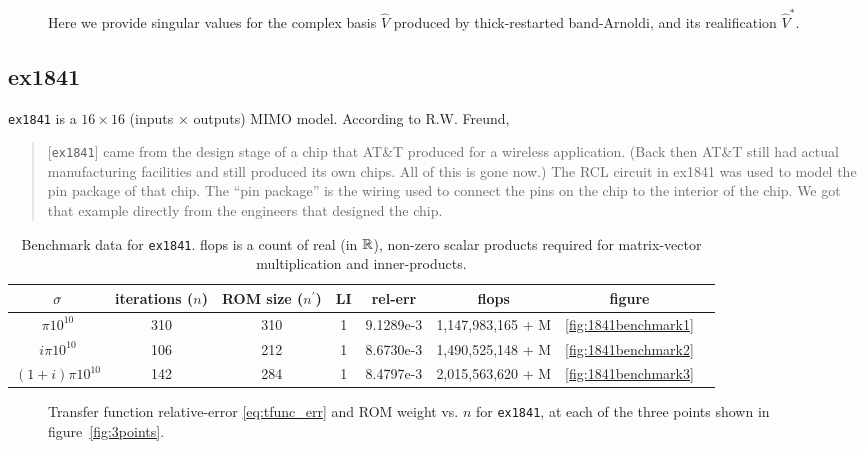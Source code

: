 \begin{figure}
\caption{\label{fig:308test1_svd} Here we provide singular values for the complex basis $\widehat{V}$ produced by thick-restarted band-Arnoldi, and its realification $\widehat{V}^*$.} 
\end{figure}


\clearpage
\subsection{ex1841}
\texttt{ex1841} is a $16\times 16$ (inputs $\times$ outputs) MIMO model.   According to R.W. Freund,
\begin{quote}
[\texttt{ex1841}] came from the design stage of a chip that AT\&T
produced for a wireless application.  (Back then AT\&T still had
actual manufacturing facilities and still produced its own chips.
All of this is gone now.)  The RCL circuit in ex1841 was used to
model the pin package of that chip.  The ``pin package'' is the
wiring used to connect the pins on the chip to the interior of the
chip.  We got that example directly from the engineers that designed
the chip. 
\end{quote}


\begin{table}
\centering
\begin{tabular}{|c|c|c|c|c|c|c|c|}
\hline
$\sigma$ & iterations ($n$) & ROM size ($n^\prime$) & LI &rel-err  & flops & figure  \\
\hline
$\pi 10^{10}$  & 310 &310 & 1 & 9.1289e-3 &   1,147,983,165 + M& \ref{fig:1841benchmark1}  \\
$i \pi  10^{10}$ &  106 & 212& 1 & 8.6730e-3 &  1,490,525,148 + M  &\ref{fig:1841benchmark2} \\
$(1+i)\pi 10^{10}$ & 142 & 284& 1&  8.4797e-3 &  2,015,563,620 + M&\ref{fig:1841benchmark3} \\
\hline
\end{tabular}
\caption{\label{tab:1841tab1}Benchmark data for \texttt{ex1841}.  flops is a count of real (in $\mathbb{R}$), non-zero scalar products required for matrix-vector multiplication and inner-products. }
\end{table}



\begin{figure}
\centering
{}
\vfill
{}
\vfill
{}
\vfill
\caption{\label{fig:1841benchmarks} Transfer function relative-error \eqref{eq:tfunc_err} and ROM weight vs. $n$ for \texttt{ex1841}, at each of the three points shown in figure~\ref{fig:3points}.    }
\end{figure}



